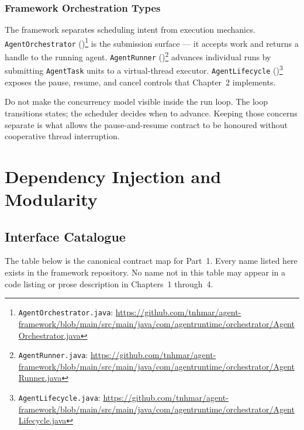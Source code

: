 \subsubsection{Framework Orchestration Types}
\label{subsec:concurrency-boundary-types}

The framework separates scheduling intent from execution mechanics.
\texttt{AgentOrchestrator} ()\footnote{\texttt{AgentOrchestrator.java}:
\url{https://github.com/tnhmar/agent-framework/blob/main/src/main/java/com/agentruntime/orchestrator/AgentOrchestrator.java}}
is the submission surface — it accepts work and returns a handle to the running agent.
\texttt{AgentRunner} ()\footnote{\texttt{AgentRunner.java}:
\url{https://github.com/tnhmar/agent-framework/blob/main/src/main/java/com/agentruntime/orchestrator/AgentRunner.java}}
advances individual runs by submitting \texttt{AgentTask} units to a virtual-thread
executor.
\texttt{AgentLifecycle} ()\footnote{\texttt{AgentLifecycle.java}:
\url{https://github.com/tnhmar/agent-framework/blob/main/src/main/java/com/agentruntime/orchestrator/AgentLifecycle.java}}
exposes the pause, resume, and cancel controls that Chapter~2 implements.

\begin{takeawaybox}
  Do not make the concurrency model visible inside the run loop.
  The loop transitions states; the scheduler decides when to advance.
  Keeping those concerns separate is what allows the pause-and-resume contract
  to be honoured without cooperative thread interruption.
\end{takeawaybox}

\section{Dependency Injection and Modularity}
\label{sec:dependency-injection-and-modularity}

\subsection{Interface Catalogue}
\label{subsec:interface-catalogue}

The table below is the canonical contract map for Part~1.
Every name listed here exists in the framework repository.
No name not in this table may appear in a code listing or prose description in
Chapters~1 through~4.

